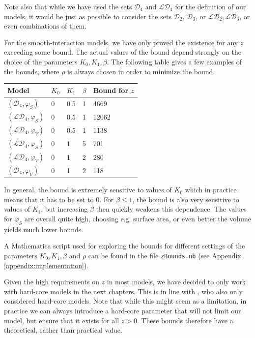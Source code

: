 Note also that while we have used the sets $\mathcal D_4$ and $\mathcal {LD}_4$ for the definition of our models, it would be just as possible to consider the sets $\mathcal D_2$, $\mathcal D_3$, or $\mathcal {LD}_2, \mathcal {LD}_3$, or even combinations of them.

\begin{remark}\label{r:zMathematica}
	For the smooth-interaction models, we have only proved the existence for any $z$ exceeding some bound. The actual values of the bound depend strongly on the choice of the parameters $K_0,K_1,\beta$. The following table gives a few examples of the bounds, where $\rho$ is always chosen in order to minimize the bound.
	\begin{center}
	\begin{tabular}{ l l l l l }
		Model & $K_0$ & $K_1$ & $\beta$ & Bound for $z$ \\
		\hline
		$(\mathcal D_4,\varphi_S)$ &  0 & 0.5 & 1 & 4669 \\
		$(\mathcal {LD}_4,\varphi_S)$ &  0 & 0.5 & 1 & 12062 \\
		$(\mathcal {LD}_4,\varphi_{V})$ &  0 & 0.5 & 1 & 1138 \\
		$(\mathcal {LD}_4,\varphi_S)$ &  0 & 1 & 5 & 701 \\
		$(\mathcal {LD}_4,\varphi_V)$ &  0 & 1 & 2 & 280 \\
		$(\mathcal {D}_4,\varphi_V)$ &  0 & 1 & 2 & 118 \\
	\end{tabular}
	\end{center}
	In general, the bound is extremely sensitive to values of $K_0$ which in practice means that it has to be set to $0$. For $\beta \leq 1$, the bound is also very sensitive to values of $K_1$, but increasing $\beta$ then quickly weakens this dependence. The values for $\varphi_S$ are overall quite high, choosing e.g. surface area, or even better the volume yields much lower bounds.

	A Mathematica script used for exploring the bounds for different settings of the parameters $K_0,K_1,\beta$ and $\rho$ can be found in the file \texttt{zBounds.nb} (see Appendix \ref{appendix:implementation}).
\end{remark}

Given the high requirements on $z$ in most models, we have decided to only work with hard-core models in the next chapters. This is in line with \cite{DereudreLavancier2011}, who also only considered hard-core models. Note that while this might seem as a limitation, in practice we can always introduce a hard-core parameter that will not limit our model, but ensure that it exists for all $z>0$. These bounds therefore have a theoretical, rather than practical value.


